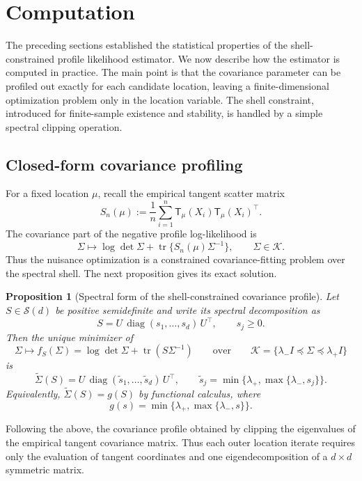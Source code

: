 \documentclass[11pt]{article}
\newtheorem{proposition}[theorem]{Proposition}
\DeclareMathOperator{\tr}{tr}
\DeclareMathOperator{\diag}{diag}
\newcommand{\Sym}{\mathcal{S}}
\newcommand{\Id}{I}
\newcommand{\shell}{\mathcal{K}}
\newcommand{\T}{\mathsf{T}}
\begin{document}
\section{Computation}
\label{sec:computation}

The preceding sections established the statistical properties of the shell-constrained profile likelihood estimator. We now describe how the estimator is computed in practice. The main point is that the covariance parameter can be profiled out exactly for each candidate location, leaving a finite-dimensional optimization problem only in the location variable. The shell constraint, introduced for finite-sample existence and stability, is handled by a simple spectral clipping operation.

\subsection{Closed-form covariance profiling}

For a fixed location $\mu$, recall the empirical tangent scatter matrix
\[
S_n(\mu)
:=
\frac1n\sum_{i=1}^n
\T_\mu(X_i)\T_\mu(X_i)^\top .
\]
The covariance part of the negative profile log-likelihood is
\[
\Sigma\mapsto
\log\det\Sigma+\tr\{S_n(\mu)\Sigma^{-1}\},
\qquad
\Sigma\in\shell .
\]
Thus the nuisance optimization is a constrained covariance-fitting problem over the spectral shell. The next proposition gives its exact solution.

\begin{proposition}[Spectral form of the shell-constrained covariance profile]
\label{prop:spectral-clipping}
Let $S\in\Sym(d)$ be positive semidefinite and write its spectral decomposition as
\[
S=U\,\diag(s_1,\dots,s_d)\,U^\top,
\qquad s_j\ge 0.
\]
Then the unique minimizer of
\[
\Sigma\mapsto f_S(\Sigma)
=
\log\det\Sigma+\tr(S\Sigma^{-1})
\qquad\text{over}\qquad
\shell=\{\lambda_-\Id\preceq \Sigma\preceq \lambda_+\Id\}
\]
is
\begin{equation}
\label{eq:spectral-clipping}
\widetilde\Sigma(S)
=
U\,\diag(\widetilde s_1,\dots,\widetilde s_d)\,U^\top,
\qquad
\widetilde s_j
=
\min\{\lambda_+,\max\{\lambda_-,s_j\}\}.
\end{equation}
Equivalently, $\widetilde\Sigma(S)=g(S)$ by functional calculus, where
\[
g(s)=\min\{\lambda_+,\max\{\lambda_-,s\}\}.
\]
\end{proposition}


Following the above, the covariance profile obtained by clipping the eigenvalues of the empirical tangent covariance matrix. Thus each outer location iterate requires only the evaluation of tangent coordinates and one eigendecomposition of a $d\times d$ symmetric matrix.
\end{document}
